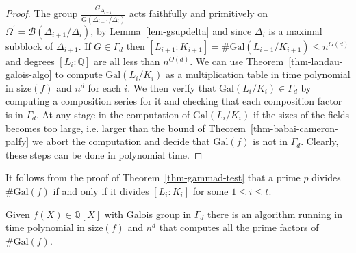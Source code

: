 \documentclass{llncs}
\newcommand{\size}[1]{{\ensuremath{\mathrm{size}\left(#1\right)}}}
\newcommand{\Gal}[1]{{\ensuremath{\mathrm{Gal}\left(#1\right)}}}
\newcommand{\Blocks}[1]{{\ensuremath{\mathcal{B}\left(#1\right)}}}
\newcommand{\Gof}[1]{{\ensuremath{\mathrm{G}\left(#1\right)}}}
\newcommand{\Q}{\ensuremath{\mathbb{Q}}}
\begin{document}
\begin{proof}
  The group $\frac{G_{\Delta_{i+1}}}{\Gof{\Delta_{i+1}/\Delta_i}}$
  acts faithfully and primitively on $\Omega^\prime =
  \Blocks{\Delta_{i+1}/\Delta_i}$, by Lemma~\ref{lem-gsupdelta} and
  since $\Delta_i$ is a maximal subblock of $\Delta_{i+1}$. If
  $G\in\Gamma_d$ then $[L_{i+1}:K_{i+1}] = \# \Gal{L_{i+1}/K_{i+1}}
  \leq n^{O(d)}$ and degrees $[L_i: \Q]$ are all less than $n^{O(d)}$.
  We can use Theorem~\ref{thm-landau-galois-algo} to compute
  $\Gal{L_i/K_i}$ as a multiplication table in time polynomial in
  $\size{f}$ and $n^d$ for each $i$. We then verify that
  $\Gal{L_i/K_i}\in\Gamma_d$ by computing a composition series for it
  and checking that each composition factor is in $\Gamma_d$. At any
  stage in the computation of $\Gal{L_i/K_i}$ if the sizes of the
  fields becomes too large, i.e.  larger than the bound of
  Theorem~\ref{thm-babai-cameron-palfy} we abort the computation and
  decide that $\Gal{f}$ is not in $\Gamma_d$. Clearly, these steps can
  be done in polynomial time.
\end{proof}

It follows from the proof of Theorem~\ref{thm-gammad-test} that a
prime $p$ divides $\# \Gal{f}$ if and only if it divides $[L_i: K_i]$
for some $1 \leq i \leq t$.

\begin{theorem}\label{thm-gammad-primes}
  Given $f(X) \in \Q[X]$ with Galois group in $\Gamma_d$ there is an
  algorithm running in time polynomial in $\size{f}$ and $n^d$ that
  computes all the prime factors of $\# \Gal{f}$.
\end{theorem}






\end{document}
